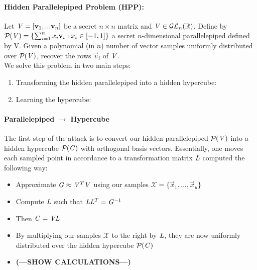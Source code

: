 \paragraph{Hidden Parallelepiped Problem (HPP):} Let $\mathit{V} = [\mathbf{v}_1, ... \mathbf{v}_n ]$ be a secret $n \times n$ matrix and $\mathit{V} \in \mathcal{GL}_{n}(\mathbb{R})$.
Define by $\mathcal{P}_{}(\mathit{V}) = \{\sum_{i=1}^{n} x_i \mathbf{v}_i : x_i \in [-1, 1]\}$ a secret $n$-dimensional parallelepiped defined by V.
Given a polynomial (in $n$) number of vector samples uniformly distributed over $\mathcal{P}_{}(\mathit{V})$, recover the rows $\vec{v}_i$ of $\mathit{V}$. \\
We solve this problem in two main steps: 
\begin{enumerate}
    \item Transforming the hidden parallelepiped into a hidden hypercube:
    \item Learning the hypercube:
\end{enumerate}
\paragraph{Parallelepiped $\rightarrow$ Hypercube}
The first step of the attack is to convert our hidden parallelepiped $\mathcal{P}_{}(\mathit{V})$ into a hidden hypercube 
$\mathcal{P}_{}(\mathit{C})$ with orthogonal basis vectors.
Essentially, one moves each sampled point in accordance to a transformation matrix $\mathit{L}$ computed the following way: \\
\begin{itemize}
    \item Approximate $\mathit{G} \approx \mathit{V}^T \mathit{V}$ using our samples $\mathcal{X} = \{\vec{x}_1, ..., \vec{x}_u\}$
    \item Compute $\mathit{L}$ such that $\mathit{L} \mathit{L}^{T} = \mathit{G}^{-1}$
    \item Then $\mathit{C} = \mathit{V} \mathit{L}$
    \item By multiplying our samples $\mathcal{X}$ to the right by $\mathit{L}$, they are now uniformly distributed over the hidden hypercube $\mathcal{P}_{}(\mathit{C})$
    \item \textbf{(---SHOW CALCULATIONS---)}
\end{itemize}


